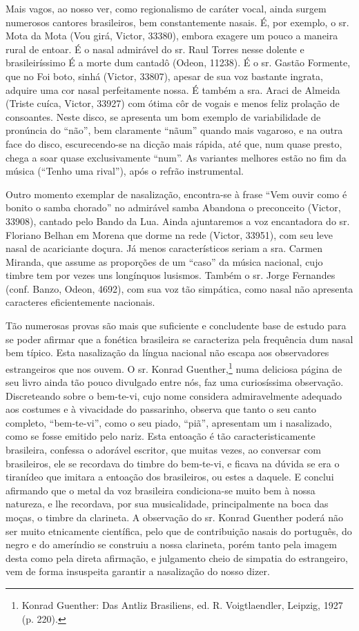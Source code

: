 Mais vagos, ao nosso ver, como regionalismo de caráter vocal, ainda
surgem numerosos cantores brasileiros, bem constantemente nasais. É, por
exemplo, o sr. Mota da Mota (Vou girá, Victor, 33380), embora exagere um
pouco a maneira rural de entoar. É o nasal admirável do sr. Raul Torres
nesse dolente e brasileiríssimo É a morte dum cantadô (Odeon, 11238). É
o sr. Gastão Formente, que no Foi boto, sinhá (Victor, 33807), apesar de
sua voz bastante ingrata, adquire uma cor nasal perfeitamente nossa. É
também a sra. Araci de Almeida (Triste cuíca, Victor, 33927) com ótima
côr de vogais e menos feliz prolação de consoantes. Neste disco, se
apresenta um bom exemplo de variabilidade de pronúncia do ``não'', bem
claramente ``nãum'' quando mais vagaroso, e na outra face do disco,
escurecendo-se na dicção mais rápida, até que, num quase presto, chega a
soar quase exclusivamente ``num''. As variantes melhores estão no fim da
música (``Tenho uma rival''), após o refrão instrumental.

Outro momento exemplar de nasalização, encontra-se à frase ``Vem ouvir
como é bonito o samba chorado'' no admirável samba Abandona o
preconceito (Victor, 33908), cantado pelo Bando da Lua. Ainda
ajuntaremos a voz encantadora do sr. Floriano Belhan em Morena que dorme
na rede (Victor, 33951), com seu leve nasal de acariciante doçura. Já
menos característicos seriam a sra. Carmen Miranda, que assume as
proporções de um ``caso'' da música nacional, cujo timbre tem por vezes
uns longínquos lusismos. Também o sr. Jorge Fernandes (conf. Banzo,
Odeon, 4692), com sua voz tão simpática, como nasal não apresenta
caracteres eficientemente nacionais.

Tão numerosas provas são mais que suficiente e concludente base de
estudo para se poder afirmar que a fonética brasileira se caracteriza
pela frequência dum nasal bem típico. Esta nasalização da língua
nacional não escapa aos observadores estrangeiros que nos ouvem. O sr.
Konrad Guenther,\footnote{Konrad Guenther: Das Antliz Brasiliens, ed. R. Voigtlaendler,
Leipzig, 1927 (p. 220).} numa deliciosa página de seu livro ainda tão pouco
divulgado entre nós, faz uma curiosíssima observação. Discreteando sobre
o bem-te-vi, cujo nome considera admiravelmente adequado aos costumes e
à vivacidade do passarinho, observa que tanto o seu canto completo,
``bem-te-vi'', como o seu piado, ``piã'', apresentam um i nasalizado,
como se fosse emitido pelo nariz. Esta entoação é tão
caracteristicamente brasileira, confessa o adorável escritor, que muitas
vezes, ao conversar com brasileiros, ele se recordava do timbre do
bem-te-vi, e ficava na dúvida se era o tiranídeo que imitara a entoação
dos brasileiros, ou estes a daquele. E conclui afirmando que o metal da
voz brasileira condiciona-se muito bem à nossa natureza, e lhe
recordava, por sua musicalidade, principalmente na boca das moças, o
timbre da clarineta. A observação do sr. Konrad Guenther poderá não ser
muito etnicamente científica, pelo que de contribuição nasais do
português, do negro e do ameríndio se construiu a nossa clarineta, porém
tanto pela imagem desta como pela direta afirmação, e julgamento cheio
de simpatia do estrangeiro, vem de forma insuspeita garantir a
nasalização do nosso dizer.

